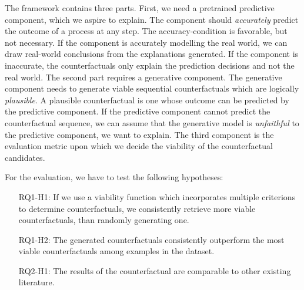 \documentclass[./../../paper.tex]{subfiles}
\begin{document}
\noindent The framework contains three parts. First, we need a pretrained predictive component, which we aspire to explain. The component should \emph{accurately} predict the outcome of a process at any step. The accuracy-condition is favorable, but not necessary. If the component is accurately modelling the real world, we can draw real-world conclusions from the explanations generated. If the component is inaccurate, the counterfactuals only explain the prediction decisions and not the real world. The second part requires a generative component. The generative component needs to generate viable sequential counterfactuals which are logically \emph{plausible}. A plausible counterfactual is one whose outcome can be  predicted by the predictive component. If the predictive component cannot predict the counterfactual sequence, we can assume that the generative model is \emph{unfaithful} to the predictive component, we want to explain. The third component is the evaluation metric upon which we decide the viability of the counterfactual candidates.

For the evaluation, we have to test the following hypotheses: 
\begin{itemize}
    \item[RQ1-H1:] If we use a viability function which incorporates multiple criterions to determine counterfactuals, we consistently retrieve more viable counterfactuals, than randomly generating one.
    \item[RQ1-H2:] The generated counterfactuals consistently outperform the most viable counterfactuals among examples in the dataset.  
    \item[RQ2-H1:] The results of the counterfactual are comparable to other existing literature.  
\end{itemize}
\end{document}
